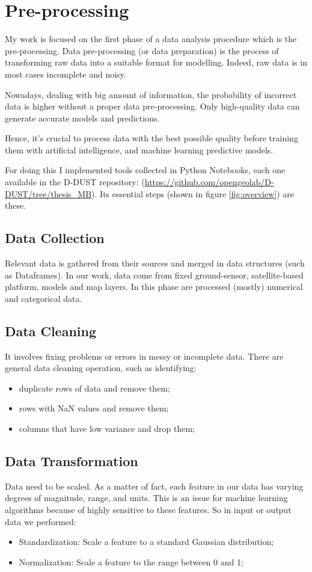 \section{Pre-processing}
My work is focused on the first phase of a data analysis procedure which is the pre-processing.
Data pre-processing (or data preparation) is the process of transforming raw data into a suitable format for modelling. 
Indeed, raw data is in most cases incomplete and noisy.\par
Nowadays, dealing with big amount of information, the probability of incorrect data is higher without a proper data pre-processing.
Only high-quality data can generate accurate models and predictions. \par
Hence, it’s crucial to process data with the best possible quality before training them with artificial intelligence, and machine learning predictive models.\par
For doing this I implemented tools collected in Python Notebooks, each one available in the D-DUST repository:
(\url{https://github.com/opengeolab/D-DUST/tree/thesis_MB}).\newline
Its essential steps (shown in figure \ref{fig:overview}) are these.

\subsection{Data Collection}
Relevant data is gathered from their sources and merged in data structures (such as Dataframes). In our work, data come from fixed ground-sensor, satellite-based platform, models and map layers. In this phase are processed (mostly) numerical and categorical data. 
\subsection{Data Cleaning}
It involves fixing problems or errors in messy or incomplete data. There are general data cleaning operation, such as identifying:
\begin{itemize}
\item duplicate rows of data and remove them;
\item rows with NaN values and remove them;
\item columns that have low variance and drop them;
\end{itemize}
\subsection{Data Transformation}
Data need to be scaled. As a matter of fact, each feature in our data has varying degrees of magnitude, range, and units. This is an issue for machine learning algorithms because of highly sensitive to these features. So in input or output data we performed:
\begin{itemize}
\item Standardization: Scale a feature to a standard Gaussian distribution;
\item Normalization: Scale a feature to the range between 0 and 1;
\end{itemize}

